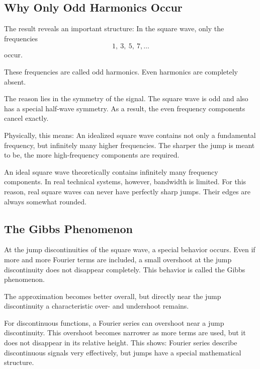 \subsection{Why Only Odd Harmonics Occur}

The result reveals an important structure:
In the square wave, only the frequencies
\[
1,\ 3,\ 5,\ 7,\ldots
\]
occur.

These frequencies are called odd harmonics.
Even harmonics are completely absent.

The reason lies in the symmetry of the signal.
The square wave is odd and also has a special half-wave symmetry.
As a result, the even frequency components cancel exactly.

Physically, this means:
An idealized square wave contains not only a fundamental frequency,
but infinitely many higher frequencies.
The sharper the jump is meant to be,
the more high-frequency components are required.

\begin{PhysicsBox}
	\small
	\label{box:anhangA-fourier-bandbreite}
	An ideal square wave theoretically contains infinitely many frequency components.
	In real technical systems, however, bandwidth is limited.
	For this reason, real square waves can never have perfectly sharp jumps.
	Their edges are always somewhat rounded.
\end{PhysicsBox}

\subsection{The Gibbs Phenomenon}

At the jump discontinuities of the square wave, a special behavior occurs.
Even if more and more Fourier terms are included,
a small overshoot at the jump discontinuity does not disappear completely.
This behavior is called the Gibbs phenomenon.

The approximation becomes better overall,
but directly near the jump discontinuity a characteristic over- and undershoot remains.

\begin{DidacticBox}
	\small
	\label{box:anhangA-fourier-gibbs}
	For discontinuous functions, a Fourier series can overshoot near a jump discontinuity.
	This overshoot becomes narrower as more terms are used,
	but it does not disappear in its relative height.
	This shows:
	Fourier series describe discontinuous signals very effectively,
	but jumps have a special mathematical structure.
\end{DidacticBox}

